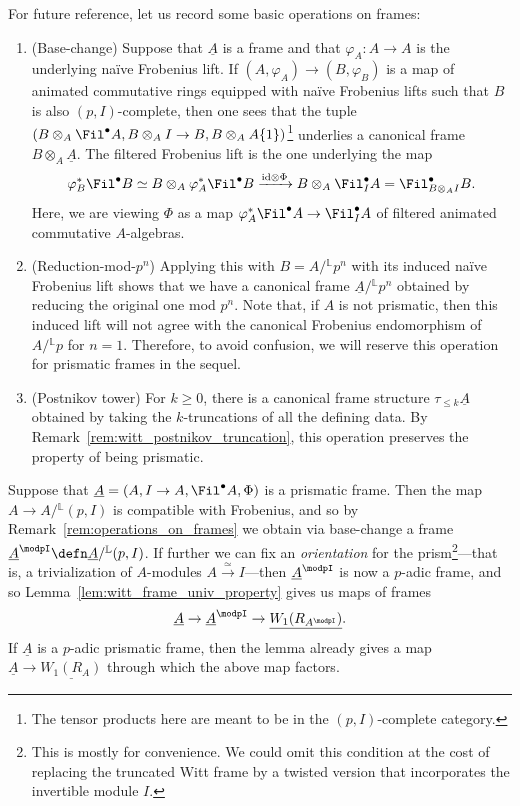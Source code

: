 \documentclass[10pt]{amsart}
\begin{document}
\begin{remark}
\label{rem:operations_on_frames}
For future reference, let us record some basic operations on frames:
\begin{enumerate}
   \item (Base-change) Suppose that $\underline{A}$ is a frame and that $\varphi_A:A\to A$ is the underlying na\"ive Frobenius lift. If $(A,\varphi_A)\to (B,\varphi_B)$ is a map of animated commutative rings equipped with na\"ive Frobenius lifts such that $B$ is also $(p,I)$-complete, then one sees that the tuple $(B\otimes_A\Fil^\bullet A,B\otimes_AI\to B,B\otimes_AA\{1\})$\footnote{The tensor products here are meant to be in the $(p,I)$-complete category.} underlies a canonical frame $B\otimes_A\underline{A}$. The filtered Frobenius lift is the one underlying the map
   \[
   \varphi^*_B\Fil^\bullet B \simeq B\otimes_A\varphi^*_A\Fil^\bullet B \xrightarrow{\mathrm{id}\otimes\Phi} B\otimes_A\Fil^\bullet_I A = \Fil^\bullet_{B\otimes_AI}B.
   \]
   Here, we are viewing $\Phi$ as a map $\varphi_A^*\Fil^\bullet A\to \Fil^\bullet_IA$ of filtered animated commutative $A$-algebras.
   \item (Reduction-mod-$p^n$) Applying this with $B=A/{}^{\mathbb{L}}p^n$ with its induced na\"ive Frobenius lift shows that we have a canonical frame $\underline{A}/{}^{\mathbb{L}}p^n$ obtained by reducing the original one mod $p^n$. Note that, if $A$ is not prismatic, then this induced lift will not agree with the canonical Frobenius endomorphism of $A/{}^{\mathbb{L}}p$ for $n=1$. Therefore, to avoid confusion, we will reserve this operation for prismatic frames in the sequel.
   \item (Postnikov tower) For $k\ge 0$, there is a canonical frame structure $\tau_{\leq k}\underline{A}$ obtained by taking the $k$-truncations of all the defining data. By Remark~\ref{rem:witt_postnikov_truncation}, this operation preserves the property of being prismatic.
\end{enumerate}
\end{remark}   

\begin{remark}
\label{rem:mod_p_and_I_frames}
Suppose that $\underline{A} = (A,I\to A,\Fil^\bullet A,\Phi)$ is a prismatic frame. Then the map $A\to A/{}^{\mathbb{L}}(p,I)$ is compatible with Frobenius, and so by Remark~\ref{rem:operations_on_frames} we obtain via base-change a frame $\underline{A}^\modpI \defn \underline{A}/{}^{\mathbb{L}}(p,I)$. If further we can fix an \emph{orientation} for the prism\footnote{This is mostly for convenience. We could omit this condition at the cost of replacing the truncated Witt frame by a twisted version that incorporates the invertible module $I$.}---that is, a trivialization of $A$-modules $A\xrightarrow{\simeq}I$---then $\underline{A}^\modpI$ is now a $p$-adic frame, and so Lemma~\ref{lem:witt_frame_univ_property} gives us maps of frames 
\[
\underline{A}\to \underline{A}^\modpI\to \underline{W_1(R_{A^\modpI})}.
\]
If $\underline{A}$ is a $p$-adic prismatic frame, then the lemma already gives a map $\underline{A}\to \underline{W_1(R_A)}$ through which the above map factors.
\end{remark}
\end{document}
